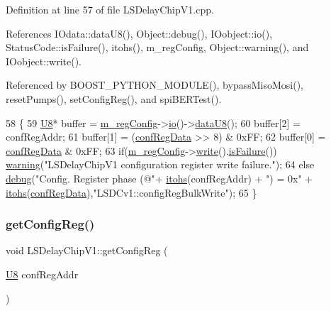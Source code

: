 Definition at line 57 of file L\+S\+Delay\+Chip\+V1.\+cpp.



References I\+Odata\+::data\+U8(), Object\+::debug(), I\+Oobject\+::io(), Status\+Code\+::is\+Failure(), itohs(), m\+\_\+reg\+Config, Object\+::warning(), and I\+Oobject\+::write().



Referenced by B\+O\+O\+S\+T\+\_\+\+P\+Y\+T\+H\+O\+N\+\_\+\+M\+O\+D\+U\+L\+E(), bypass\+Miso\+Mosi(), reset\+Pumps(), set\+Config\+Reg(), and spi\+B\+E\+R\+Test().


\begin{DoxyCode}
58 \{
59     \hyperlink{ICECALv3_8h_a3cb25ca6f51f003950f9625ff05536fc}{U8}* buffer = \hyperlink{classLSDelayChipV1_afd1cfdcb114549dc1466c77f07d39fe0}{m\_regConfig}->\hyperlink{classIOobject_af04fb94137c3d86849f478ac5afab5d1}{io}()->\hyperlink{classIOdata_a75e9c318dbac3a39402179070943d4bc}{dataU8}();
60     buffer[2] = confRegAddr;
61     buffer[1] = (\hyperlink{structconfRegData}{confRegData} >> 8) & 0xFF;
62     buffer[0] =  \hyperlink{structconfRegData}{confRegData}       & 0xFF;
63     \textcolor{keywordflow}{if}(\hyperlink{classLSDelayChipV1_afd1cfdcb114549dc1466c77f07d39fe0}{m\_regConfig}->\hyperlink{classIOobject_a9f6984bc9f0fadcf800f1be2523ac744}{write}().\hyperlink{classStatusCode_a5dd22dc6eb2c52fc4cabc58f6dea2eb7}{isFailure}())   \hyperlink{classObject_a65cd4fda577711660821fd2cd5a3b4c9}{warning}(\textcolor{stringliteral}{"LSDelayChipV1
       configuration register write failure."});
64     \textcolor{keywordflow}{else}                                    \hyperlink{classObject_aac010553f022165573714b7014a15f0d}{debug}(\textcolor{stringliteral}{"Config. Register phase (@"}+ 
      \hyperlink{classLSDelayChipV1_af7f4d72fb404b6b3d7b41fd01876ed0a}{itohs}(confRegAddr) + \textcolor{stringliteral}{") = 0x"} + \hyperlink{classLSDelayChipV1_af7f4d72fb404b6b3d7b41fd01876ed0a}{itohs}(\hyperlink{structconfRegData}{confRegData}),\textcolor{stringliteral}{"LSDCv1::configRegBulkWrite"});
65 \}
\end{DoxyCode}
\mbox{\label{classLSDelayChipV1_a4f338071d49df7eae55020a5f5fa8474}} 
\subsubsection{\texorpdfstring{get\+Config\+Reg()}{getConfigReg()}}
{\footnotesize\ttfamily void L\+S\+Delay\+Chip\+V1\+::get\+Config\+Reg (\begin{DoxyParamCaption}\item[{\hyperlink{ICECALv3_8h_a3cb25ca6f51f003950f9625ff05536fc}{U8}}]{conf\+Reg\+Addr }\end{DoxyParamCaption})}



